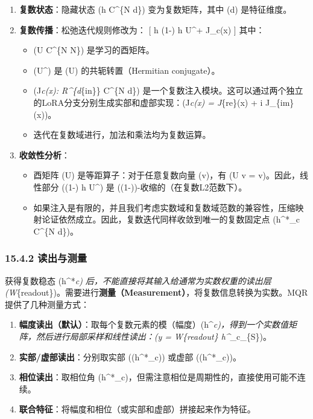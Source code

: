 \documentclass[
  12pt,
]{article}
\providecommand{\tightlist}{%
  \setlength{\itemsep}{0pt}\setlength{\parskip}{0pt}}
\begin{document}
\begin{enumerate}
\def\labelenumi{\arabic{enumi}.}
\tightlist
\item
  \textbf{复数状态}：隐藏状态 (h \in C\^{}\{N \times d\})
  变为复数矩阵，其中 (d) 是特征维度。
\item
  \textbf{复数传播}：松弛迭代规则修改为： {[} h \leftarrow (1-\alpha) h
  U\^{}\dagger + \alpha J\_c(x) {]} 其中：

  \begin{itemize}
  \tightlist
  \item
    (U \in C\^{}\{N \times N\}) 是学习的酉矩阵。
  \item
    (U\^{}\dagger) 是 (U) 的共轭转置（Hermitian conjugate）。
  \item
    (J\emph{c(x): R\^{}\{d}\{in\}\}
    \to C\^{}\{N \times d\})
    是一个复数注入模块。这可以通过两个独立的LoRA分支分别生成实部和虚部实现：(J\emph{c(x)
    = J}\{re\}(x) + i \cdot J\_\{im\}(x))。
  \item
    迭代在复数域进行，加法和乘法均为复数运算。
  \end{itemize}
\item
  \textbf{收敛性分析}：

  \begin{itemize}
  \tightlist
  \item
    酉矩阵 (U) 是等距算子：对于任意复数向量 (v)，有 (\textbar U
    v\textbar{} = \textbar v\textbar)。因此，线性部分 ((1-\alpha) h
    U\^{}\dagger) 是 ((1-\alpha))-收缩的（在复数L2范数下）。
  \item
    如果注入是有限的，并且我们考虑实数域和复数域范数的兼容性，压缩映射论证依然成立。因此，复数迭代同样收敛到唯一的复数固定点
    (h\^{}*\_c \in C\^{}\{N \times d\})。
  \end{itemize}
\end{enumerate}

\hypertarget{ux8bfbux51faux4e0eux6d4bux91cf}{%
\subsubsection{15.4.2 读出与测量}\label{ux8bfbux51faux4e0eux6d4bux91cf}}

获得复数稳态 (h\^{}*\emph{c)
后，不能直接将其输入给通常为实数权重的读出层
(W}\{readout\})。需要进行\textbf{测量（Measurement）}，将复数信息转换为实数。MQR提供了几种测量方式：

\begin{enumerate}
\def\labelenumi{\arabic{enumi}.}
\tightlist
\item
  \textbf{幅度读出（默认）}：取每个复数元素的模（幅度）(\textbar h\^{}\emph{\emph{c\textbar)，得到一个实数值矩阵，然后进行局部采样和线性读出：(y
  = W}\{readout\} \cdot \textbar h\^{}}\_c\textbar\_\{S\})。
\item
  \textbf{实部/虚部读出}：分别取实部 (\Re(h\^{}*\_c)) 或虚部
  (\Im(h\^{}*\_c))。
\item
  \textbf{相位读出}：取相位角
  (\angle h\^{}*\_c)，但需注意相位是周期性的，直接使用可能不连续。
\item
  \textbf{联合特征}：将幅度和相位（或实部和虚部）拼接起来作为特征。
\end{enumerate}
\end{document}
